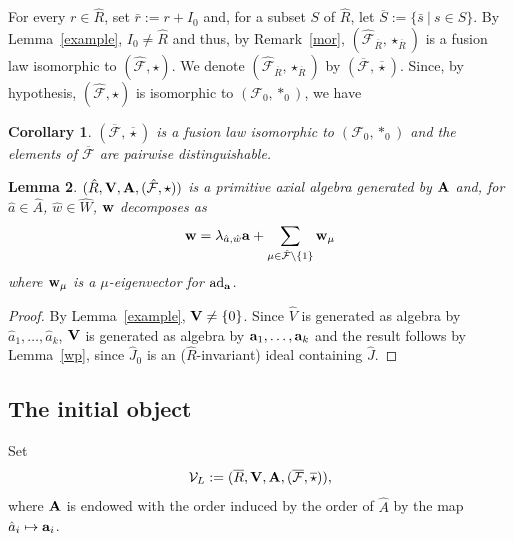 \documentclass[a4paper]{amsart}
\newtheorem{lemma}{Lemma}[section]
\newtheorem{cor}[lemma]{Corollary}
\newcommand{\Amo}{{\mathcal {\bf A}}}
\newcommand{\A}{ {\hat A}}
\newcommand{\Ro}{{\overline R}}
\newcommand{\Vo}{{\bf V}}
\newcommand{\So}{{\hat {\mathcal F}}}
\newcommand{\ad}{{\rm ad}}
\newcommand{\aR}{{\hat R}}
\newcommand{\hW}{{\hat W}}
\newcommand{\hJ}{{\hat J}}
\newcommand{\ha}{{\hat a}}
\newcommand{\hw}{{\hat w}}
\newcommand{\ba}{{\bf a}}
\newcommand{\bw}{{\bf w}}
\begin{document}
For every $r\in \aR$, set $\bar r:=r+I_0$ and, for a subset $S$ of $\hat R$, let ${\overline S}:=\{\bar s\:|\:s\in S\}$. By Lemma~\ref{example}, $I_0\neq \hat R$ and thus, by Remark~\ref{mor}, $(\hat{\mathcal F}_{\Ro}, \star_{\Ro})$ is a fusion law isomorphic to $(\hat{\mathcal F}, \star)$.   We 
 denote $(\hat{\mathcal F}_{\Ro}, \star_{\Ro})$ by $(\overline{\mathcal{F}}, \overline{\star})$. Since, by hypothesis, $(\hat{\mathcal F}, \star)$ is isomorphic to $(\mathcal F_0, \ast_0)$, we have

\begin{cor}
\label{rem2}
 $(\overline{\mathcal F}, \overline \star)$ is a fusion law isomorphic to $(\mathcal F_0, \ast_0)$ and the elements of $\overline{\mathcal F}$ are pairwise distinguishable. 
\end{cor}

\begin{lemma}\label{wpbis}
 $(\aR, \Vo, \Amo, (\So, \star))$ is a  primitive axial algebra generated by $\Amo$ and, for $\ha \in \A$, $\hw \in \hW$, $\bw$ decomposes as 
 \begin{equation}\label{eqwpbis}
\bw=\lambda_{\ha,\hw}\ba+\sum_{\mu\in \hat{\mathcal F}\setminus \{1\}}\bw_\mu
\end{equation}
where $ \bw_\mu$ is a $\mu$-eigenvector for $\ad_{\ba}$.
\end{lemma}
\begin{proof}
By Lemma~\ref{example},  $\Vo\neq \{0\}$. Since $\hat V$ is generated as algebra by $\hat a_1, \ldots , \hat a_k$, $\Vo$ is generated as algebra by $\ba_1, \ldots , \ba_k$ and the result follows by Lemma~\ref{wp}, since $\hJ_0$ is an ($\aR$-invariant) ideal containing $\hJ$.
\end{proof}

\subsection{The initial object}
Set 
$$
\mathcal V_L:=(\Ro,\Vo, \Amo, (\overline{\mathcal F}, \overline \star)),
$$
where $\Amo$ is endowed with the order induced by the order of $\A$ by the map $\ha_i\mapsto \ba_i$.
\end{document}
